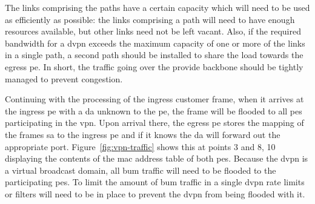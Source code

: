The links comprising the paths have a certain capacity which will need to be used as efficiently as possible: the links comprising a path will need to have enough resources available, but other links need not be left vacant. Also, if the required bandwidth for a \ac{dvpn} exceeds the maximum capacity of one or more of the links in a single path, a second path should be installed to share the load towards the egress \ac{pe}. In short, the traffic going over the provide backbone should be tightly managed to prevent congestion. 

Continuing with the processing of the ingress customer frame, when it arrives at the ingress \ac{pe} with a \ac{da} unknown to the \ac{pe}, the frame will be flooded to all \acp{pe} participating in the \ac{vpn}. Upon arrival there, the egress \ac{pe} stores the mapping of the frames \ac{sa} to the ingress \ac{pe} and if it knows the \ac{da} will forward out the appropriate port. Figure~\ref{fig:vpn-traffic} shows this at points 3 and 8, 10 displaying the contents of the \ac{mac} address table of both \acp{pe}. Because the \ac{dvpn} is a virtual broadcast domain, all \ac{bum} traffic will need to be flooded to the participating \acp{pe}. To limit the amount of \ac{bum} traffic in a single \ac{dvpn} rate limits or filters will need to be in place to prevent the \ac{dvpn} from being flooded with it.



